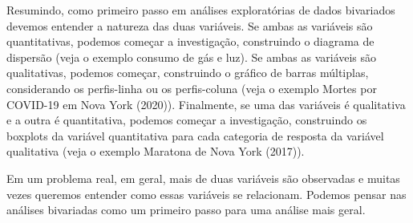 Resumindo, como primeiro passo em análises exploratórias de dados bivariados devemos entender a natureza das duas variáveis. Se ambas as variáveis são quantitativas, podemos começar a investigação, construindo o diagrama de dispersão (veja o exemplo consumo de gás e luz). Se ambas as variáveis são qualitativas, podemos começar, construindo o gráfico de barras múltiplas, considerando os perfis-linha ou os perfis-coluna (veja o exemplo Mortes por COVID-19 em Nova York (2020)). Finalmente, se uma das variáveis é qualitativa e a outra é quantitativa, podemos começar a investigação, construindo os boxplots da variável quantitativa para cada categoria de resposta da variável qualitativa (veja o exemplo Maratona de Nova York (2017)).

Em um problema real, em geral, mais de duas variáveis são observadas e muitas vezes queremos entender como essas variáveis se relacionam. Podemos pensar nas análises bivariadas como um primeiro passo para uma análise mais geral.
\clearpage

